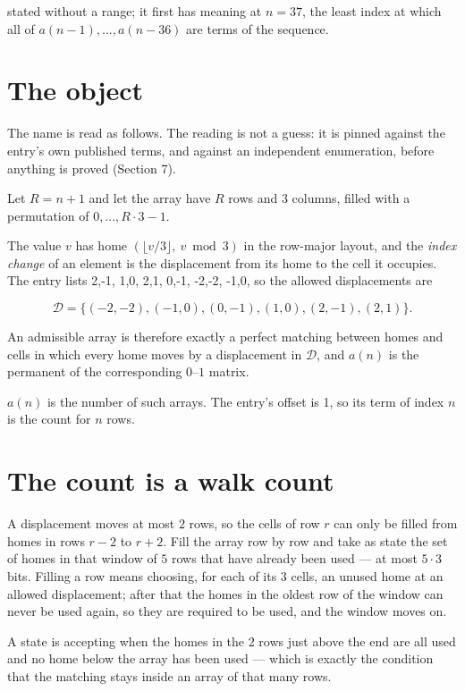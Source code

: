 \documentclass[11pt]{article}
\theoremstyle{definition}
\begin{document}
stated without a range; it first has meaning at $n = 37$, the least index at which all of $a(n-1),\dots,a(n-36)$ are terms of the sequence.

\section{The object}

The name is read as follows. The reading is not a guess: it is pinned against the entry's own published terms, and against an independent enumeration, before anything is proved (Section 7).

Let $R = n + 1$ and let the array have $R$ rows and $3$ columns, filled with a permutation of $0,\dots,R\cdot3-1$.

The value $v$ has home $(\lfloor v/3\rfloor,\ v \bmod 3)$ in the row-major layout, and the {\itshape index change} of an element is the displacement from its home to the cell it occupies. The entry lists 2,-1, 1,0, 2,1, 0,-1, -2,-2, -1,0, so the allowed displacements are

\[\mathcal{D} = \{(-2,-2), (-1,0), (0,-1), (1,0), (2,-1), (2,1)\}.\]

An admissible array is therefore exactly a perfect matching between homes and cells in which every home moves by a displacement in $\mathcal{D}$, and $a(n)$ is the permanent of the corresponding $0$--$1$ matrix.

$a(n)$ is the number of such arrays. The entry's offset is 1, so its term of index $n$ is the count for $n$ rows.

\section{The count is a walk count}

A displacement moves at most $2$ rows, so the cells of row $r$ can only be filled from homes in rows $r-2$ to $r+2$. Fill the array row by row and take as state the set of homes in that window of $5$ rows that have already been used --- at most $5\cdot3$ bits. Filling a row means choosing, for each of its $3$ cells, an unused home at an allowed displacement; after that the homes in the oldest row of the window can never be used again, so they are required to be used, and the window moves on.

A state is accepting when the homes in the $2$ rows just above the end are all used and no home below the array has been used --- which is exactly the condition that the matching stays inside an array of that many rows.
\end{document}
